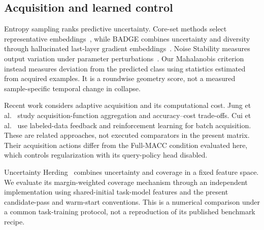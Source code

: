\documentclass[a4paper,fleqn]{cas-dc}
\begin{document}
\subsection{Acquisition and learned control}

Entropy sampling ranks predictive uncertainty. Core-set methods select
representative embeddings~\cite{sener2018active}, while BADGE combines
uncertainty and diversity through hallucinated last-layer gradient
embeddings~\cite{ash2020badge}. Noise Stability measures output
variation under parameter perturbations~\cite{li2024noise}.
Our Mahalanobis criterion instead measures deviation from the
predicted class using statistics estimated from acquired examples.
It is a roundwise geometry score, not a measured sample-specific
temporal change in collapse.

Recent work considers adaptive acquisition and its computational
cost. Jung et al.~\cite{jung2026aggregation} study acquisition-function
aggregation and accuracy--cost trade-offs. Cui et
al.~\cite{cui2026trustset} use labeled-data feedback and reinforcement
learning for batch acquisition. These are related approaches, not
executed comparators in the present matrix. Their acquisition actions
differ from the Full-MACC condition evaluated here, which controls
regularization with its query-policy head disabled.

Uncertainty Herding~\cite{bae2025uncertainty} combines uncertainty
and coverage in a fixed feature space. We evaluate its
margin-weighted coverage mechanism through an independent
implementation using shared-initial task-model features and the
present candidate-pass and warm-start conventions. This is a
numerical comparison under a common task-training protocol, not a
reproduction of its published benchmark recipe.
\end{document}
